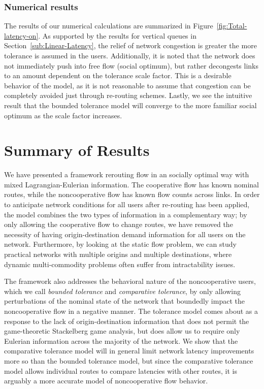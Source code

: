 \subsubsection{Numerical results\label{sub:Numerical-results}}

The results of our numerical calculations are summarized in Figure~\ref{fig:Total-latency-on}.
As supported by the results for vertical queues in Section~\ref{sub:Linear-Latency},
the relief of network congestion is greater the more tolerance is
assumed in the users. Additionally, it is noted that the network does
not immediately push into free flow (social optimum), but rather decongests
links to an amount dependent on the tolerance scale factor. This is
a desirable behavior of the model, as it is not reasonable to assume
that congestion can be completely avoided just through re-routing
schemes. Lastly, we see the intuitive result that the bounded tolerance
model will converge to the more familiar social optimum as the scale
factor increases.



\section{Summary of Results}
\label{sec:le:Conclusion}

We have presented a framework rerouting flow in an socially optimal
way with mixed Lagrangian-Eulerian information. The cooperative flow
has known nominal routes, while the noncooperative flow has known
flow counts across links. In order to anticipate network conditions
for all users after re-routing has been applied, the model combines
the two types of information in a complementary way; by only allowing
the cooperative flow to change routes, we have removed the necessity
of having origin-destination demand information for all users on the
network. Furthermore, by looking at the static flow problem, we can
study practical networks with multiple origins and multiple destinations,
where dynamic multi-commodity problems often suffer from intractability
issues.

The framework also addresses the behavioral nature of the noncooperative
users, which we call \emph{bounded tolerance }and \emph{comparative
tolerance}, by only allowing perturbations of the nominal state of
the network that boundedly impact the noncooperative flow in a negative
manner. The tolerance model comes about as a response to the lack
of origin-destination information that does not permit the game-theoretic
Stackelberg game analysis, but does allow us to require only Eulerian
information across the majority of the network. We show that the comparative
tolerance model will in general limit network latency improvements
more so than the bounded tolerance model, but since the comparative
tolerance model allows individual routes to compare latencies with
other routes, it is arguably a more accurate model of noncooperative
flow behavior.

